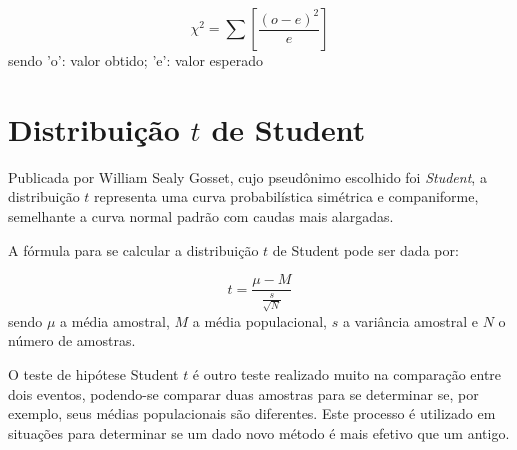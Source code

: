 \begin{equation}
\chi^2 = \sum [\frac{(o-e)^2}{e}]
\end{equation}
sendo 'o': valor obtido; 'e': valor esperado

\section{Distribuição $t$ de Student}
Publicada por William Sealy Gosset, cujo pseudônimo escolhido foi \textit{Student}, a distribuição $t$ representa uma curva probabilística simétrica e companiforme, semelhante a curva normal padrão com caudas mais alargadas. 

A fórmula para se calcular a distribuição $t$ de Student pode ser dada por:

\begin{equation}
t = \frac{\mu - M}{\frac{s}{\sqrt{N}}}
\end{equation}
sendo $\mu$ a média amostral, $M$ a média populacional, $s$ a variância amostral e $N$ o número de amostras.

O teste de hipótese Student $t$ é outro teste realizado muito na comparação entre dois eventos, podendo-se comparar duas amostras para se determinar se, por exemplo, seus médias populacionais são diferentes. Este processo é utilizado em situações para determinar se um dado novo método é mais efetivo que um antigo.